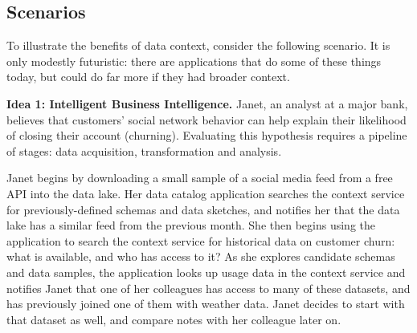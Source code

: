 \documentclass{sig-alternate}
\begin{document}
\subsection{Scenarios}
To illustrate the benefits of data context, consider the following scenario. It is only modestly futuristic: there are applications that do some of these things today, but could do far more if they had broader context.

\textbf{Idea 1: Intelligent Business Intelligence.}  Janet, an analyst at a major bank, believes that customers' social network behavior can help explain their likelihood of closing their account (churning). Evaluating this hypothesis requires a pipeline of stages: data acquisition, transformation and analysis. 

Janet 
begins by downloading a small sample of a social media feed from a free API into the data lake. Her data catalog application searches the context service for previously-defined schemas and data sketches, and notifies her that the data lake has a similar feed from the previous month. 
She then begins using the application to search the context service for historical data on customer churn: what is available, and who has access to it?  As she explores candidate schemas and data samples, the application looks up usage data in the context service and notifies Janet that one of her colleagues has access to many of these datasets, and has previously joined one of them with weather data. Janet decides to start with that dataset as well, and compare notes with her colleague later on.  
\end{document}
